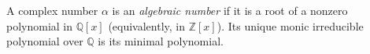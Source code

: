 
A complex number $\alpha$ is an \emph{algebraic number} if it is a root of a nonzero polynomial in $\mathbb Q[x]$ (equivalently, in $\mathbb Z[x]$). Its unique monic irreducible polynomial over $\mathbb Q$ is its minimal polynomial.
